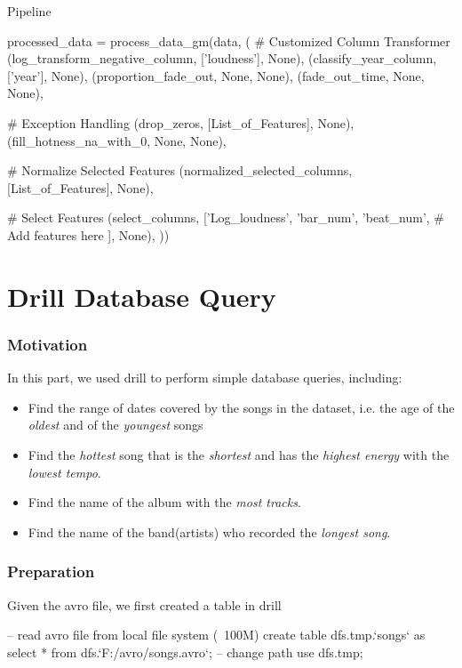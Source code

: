 \documentclass{beamer}
\begin{document}
\begin{frame}[fragile]{Pipeline}
\begin{mycodetiny}
processed_data = process_data_gm(data, (
    # Customized Column Transformer
    (log_transform_negative_column, ['loudness'], None),
    (classify_year_column, ['year'], None),
    (proportion_fade_out, None, None),
    (fade_out_time, None, None),

    # Exception Handling
    (drop_zeros, [List_of_Features], None),
    (fill_hotness_na_with_0, None,  None),

    # Normalize Selected Features
    (normalized_selected_columns, [List_of_Features], None),

    # Select Features
    (select_columns, ['Log_loudness', 'bar_num', 'beat_num', 
                      # Add features here
                      ], None),
))
\end{mycodetiny}  

    
\end{frame}





\section{Drill Database Query}

\begin{frame}
\frametitle{Motivation}
In this part, we used drill to perform simple database queries, including:

\begin{itemize}
    \item Find the range of dates covered by the songs in the dataset, i.e. the age of the \emph{oldest} and of the \emph{youngest} songs
    \item Find the \emph{hottest} song that is the \emph{shortest} and has the \emph{highest energy} with the \emph{lowest tempo}.
    \item Find the name of the album with the \emph{most tracks}.
    \item Find the name of the band(artists) who recorded the \emph{longest song}.
\end{itemize}
\end{frame}

\begin{frame}[fragile]

\frametitle{Preparation}

Given the avro file, we first created a table in drill

\begin{mycodesql}
-- read avro file from local file system (~100M)
create table dfs.tmp.`songs` as
select * from dfs.`F:/avro/songs.avro`;
-- change path
use dfs.tmp;
\end{mycodesql}

\end{frame}
\end{document}
